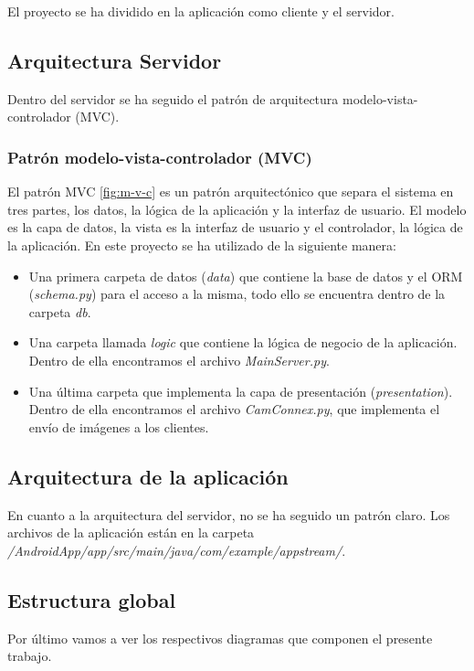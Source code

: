El proyecto se ha dividido en la aplicación como cliente y el servidor.

\subsection{Arquitectura Servidor}

Dentro del servidor se ha seguido el patrón de arquitectura modelo-vista-controlador (MVC).

\subsubsection{Patrón modelo-vista-controlador (MVC)}

El patrón MVC \ref{fig:m-v-c} es un patrón arquitectónico que separa el sistema en tres partes, los datos, la lógica de la aplicación y la interfaz de usuario. El modelo es la capa de datos, la vista es la interfaz de usuario y el controlador, la lógica de la aplicación.
En este proyecto se ha utilizado de la siguiente manera:
\begin{itemize}
\item
	Una primera carpeta de datos (\textit{data}) que contiene la base de datos y el ORM (\textit{schema.py}) para el acceso a la misma, todo ello se encuentra dentro de la carpeta \textit{db}.
\item
	Una carpeta llamada \textit{logic} que contiene la lógica de negocio de la aplicación. 
	Dentro de ella encontramos el archivo \textit{MainServer.py}. 
\item
	Una última carpeta que implementa la capa de presentación (\textit{presentation}).
	Dentro de ella encontramos el archivo \textit{CamConnex.py}, que implementa el envío de imágenes a los clientes.
\end{itemize}

\subsection{Arquitectura de la aplicación}

En cuanto a la arquitectura del servidor, no se ha seguido un patrón claro.
Los archivos de la aplicación están en la carpeta \textit{/AndroidApp/app/src/main/java/com/example/appstream/}.

\subsection{Estructura global}

Por último vamos a ver los respectivos diagramas que componen el presente trabajo.


\begin{landscape}
\end{landscape}